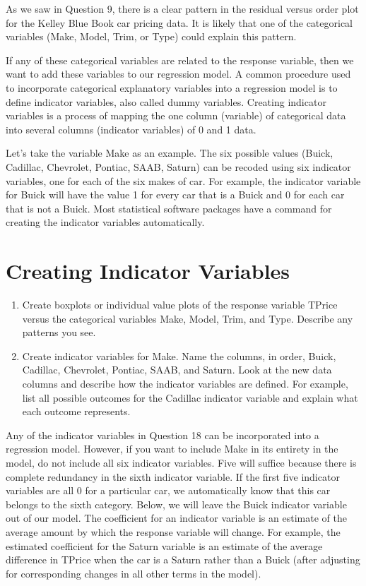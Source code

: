 \documentclass[
]{report}
\begin{document}
As we saw in Question 9, there is a clear pattern in the residual versus order plot for the Kelley Blue Book car pricing data. It is likely that one of the categorical variables (Make, Model, Trim, or Type) could explain this pattern.

If any of these categorical variables are related to the response variable, then we want to add these variables to our regression model. A common procedure used to incorporate categorical explanatory variables into a regression model is to define indicator variables, also called dummy variables. Creating indicator variables is a process of mapping the one column (variable) of categorical data into several columns (indicator variables) of 0 and 1 data.

Let's take the variable Make as an example. The six possible values (Buick, Cadillac, Chevrolet, Pontiac, SAAB, Saturn) can be recoded using six indicator variables, one for each of the six makes of car. For example, the indicator variable for Buick will have the value 1 for every car that is a Buick and 0 for each car that is not a Buick. Most statistical software packages have a command for creating the indicator variables automatically.

\hypertarget{creating-indicator-variables}{%
\section*{Creating Indicator Variables}\label{creating-indicator-variables}}

\begin{enumerate}
\def\labelenumi{\arabic{enumi}.}
\setcounter{enumi}{16}
\item
  Create boxplots or individual value plots of the response variable TPrice versus the categorical variables Make, Model, Trim, and Type. Describe any patterns you see.
\item
  Create indicator variables for Make. Name the columns, in order, Buick, Cadillac, Chevrolet, Pontiac, SAAB, and Saturn. Look at the new data columns and describe how the indicator variables are defined. For example, list all possible outcomes for the Cadillac indicator variable and explain what each outcome
  represents.
\end{enumerate}

Any of the indicator variables in Question 18 can be incorporated into a regression model. However, if you want to include Make in its entirety in the model, do not include all six indicator variables. Five will suffice because there is complete redundancy in the sixth indicator variable. If the first five indicator variables are all 0 for a particular car, we automatically know that this car belongs to the sixth category. Below, we will leave the Buick indicator variable out of our model. The coefficient for an indicator variable is an estimate of the average amount by which the response variable will change. For example, the estimated coefficient for the Saturn variable is an estimate of the average difference in TPrice when the car is a Saturn rather than a Buick (after adjusting for corresponding changes in all other terms in the model).
\end{document}
